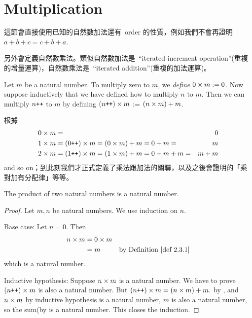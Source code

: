 \section{Multiplication}\label{sec 2.3}


\begin{note}
這節會直接使用已知的自然數加法還有\ order 的性質，例如我們不會再證明\ \(a + b + c = c + b + a\).

另外會定義自然數乘法。類似自然數加法是\ ``iterated increment operation''(重複的增量運算)，自然數乘法是\ ``iterated addition''(重複的加法運算)。
\end{note}

\begin{definition}\label{def 2.3.1} Let \(m\) be a natural number. To multiply zero to \(m\), we \emph{define} \(0 \times m := 0\). Now suppose inductively that we have defined how to multiply \(n\) to \(m\). Then we can multiply \(n\texttt{++}\) to \(m\) by defining \((n\texttt{++}) \times m\) := \((n \times m) + m\).
\end{definition}

\begin{note}
根據\ 
    \begin{align*}
    0 \times m & = & 0 \\
    1 \times m & = (0\texttt{++}) \times m = (0 \times m) + m = 0 + m = & m \\
    2 \times m & = (1\texttt{++}) \times m = (1 \times m) + m = 0 + m + m = & m + m
    \end{align*}
and so on；到此刻我們才正式定義了乘法跟加法的關聯，以及之後會證明的「乘對加有分配律」等等。
\end{note}

\begin{additional corollary} \label{ac 2.3.1}
The product of two natural numbers is a natural number.
\end{additional corollary}
\begin{proof}
Let \(m, n\) be natural numbers. We use induction on \(n\).

Base case: Let \(n = 0\). Then
\begin{align*}
    n \X m & = 0 \X m & \\
           & = m      & \text{by \DEF{2.3.1}}
\end{align*}
which is a natural number.

Inductive hypothesis: Suppose \(n \times m\) is a natural number. We have to prove \((n\texttt{++}) \times m\) is also a natural number. But \((n\texttt{++}) \times m = (n \times m) + m.\) by , and \(n \times m\) by inductive hypothesis is a natural number, \(m\) is also a natural number, so the sum(by  is a natural number. This closes the induction.
\end{proof}

